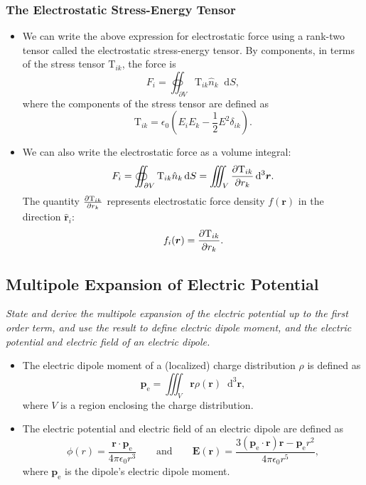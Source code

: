 \documentclass[11pt, a4paper]{article}
\newcommand{\diff}{\mathop{}\!\mathrm{d}} %
\newcommand{\dr}{\diff^{3} \r}  %
\renewcommand{\vec}[1]{\bm{#1}} %
\newcommand{\uvec}[1]{\hat{\vec{#1}}} %
\renewcommand{\r}{\vec{r}}
\newcommand{\E}{\vec{E}} %
\newcommand{\TT}{\mathrm{T}}  %
\newcommand{\ee}{\epsilon_{0}}  %
\newcommand{\pe}{\vec{p}_{\text{e}}}  %
\begin{document}
\subsubsection{The Electrostatic Stress-Energy Tensor}
\begin{itemize}
	\item We can write the above expression for electrostatic force using a rank-two tensor called the electrostatic stress-energy tensor. By components, in terms of the stress tensor $ \TT_{ik} $, the force is
	\begin{equation*}
		F_{i} = \oiint_{\partial V} \TT_{ik} \hat{n}_{k} \diff S,
	\end{equation*}
	where the components of the stress tensor are defined as
	\begin{equation*}
		\TT_{ik} = \ee \left(E_{i}E_{k} - \frac{1}{2}E^{2}\delta_{ik} \right).
	\end{equation*}
	
	\item We can also write the electrostatic force as a volume integral:
	\begin{equation*}
		F_{i} = \oiint_{\partial V} \TT_{ik} \hat{n}_{k} \diff S = \iiint_{V} \pdv{\TT_{ik}}{r_{k}} \dr.
	\end{equation*}
	The quantity $ \pdv{\TT_{ik}}{r_{k}} $ represents electrostatic force density $ f(\r) $ in the direction $ \uvec{r}_{i} $:
	\begin{equation*}
		f_{i}(\r) = \pdv{\TT_{ik}}{r_{k}}.
	\end{equation*}
	
\end{itemize}
    

\subsection{Multipole Expansion of Electric Potential}
\textit{State and derive the multipole expansion of the electric potential up to the first order term, and use the result to define electric dipole moment, and the electric potential and electric field of an electric dipole.}

\begin{itemize}
    \item The electric dipole moment of a (localized) charge distribution $ \rho $ is defined as
    \begin{equation*}
        \pe = \iiint_{V} \r \rho(\r) \dr,
    \end{equation*}
    where $ V $ is a region enclosing the charge distribution.

    \item The electric potential and electric field of an electric dipole are defined as
    \begin{equation*}
        \phi(r) = \frac{\r \cdot \pe}{4\pi \ee r^{3}} \qquad \text{and} \qquad \E(\r) = \frac{3(\pe \cdot \r)\r - \pe r^{2}}{4 \pi \ee r^{5}},
    \end{equation*}
    where $ \pe $ is the dipole's electric dipole moment.
    
\end{itemize}
\end{document}
